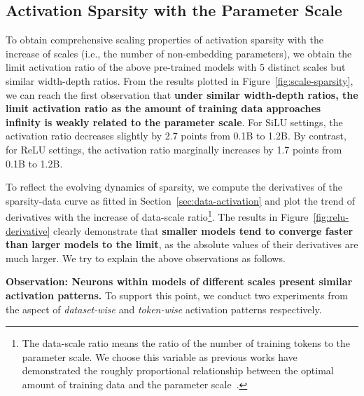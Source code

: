 \documentclass{article} %
\begin{document}
\subsection{Activation Sparsity with the Parameter Scale} \label{sec:sparsity-scale}


\vspace{1em}

To obtain comprehensive scaling properties of activation sparsity with the increase of scales (i.e., the number of non-embedding parameters), we obtain the limit activation ratio of the above pre-trained models with 5 distinct scales but similar width-depth ratios. From the results plotted in Figure~\ref{fig:scale-sparsity}, we can reach the first observation that \textbf{under similar width-depth ratios, the limit activation ratio as the amount of training data approaches infinity is weakly related to the parameter scale}. For SiLU settings, the activation ratio decreases slightly by 2.7 points from 0.1B to 1.2B. By contrast, for ReLU settings, the activation ratio marginally increases by 1.7 points from 0.1B to 1.2B.

To reflect the evolving dynamics of sparsity, we compute the derivatives of the sparsity-data curve as fitted in Section~\ref{sec:data-activation} and plot the trend of derivatives with the increase of data-scale ratio\footnote{The data-scale ratio means the ratio of the number of training tokens to the parameter scale. We choose this variable as previous works have demonstrated the roughly proportional relationship between the optimal amount of training data and the parameter scale~\citep{hoffmann2022training,besiroglu2024chinchilla}.}. The results in Figure~\ref{fig:relu-derivative} clearly demonstrate that \textbf{smaller models tend to converge faster than larger models to the limit}, as the absolute values of their derivatives are much larger. We try to explain the above observations as follows.

\textbf{Observation: Neurons within models of different scales present similar activation patterns.} To support this point, we conduct two experiments from the aspect of \textit{dataset-wise} and \textit{token-wise} activation patterns respectively. 
\end{document}
